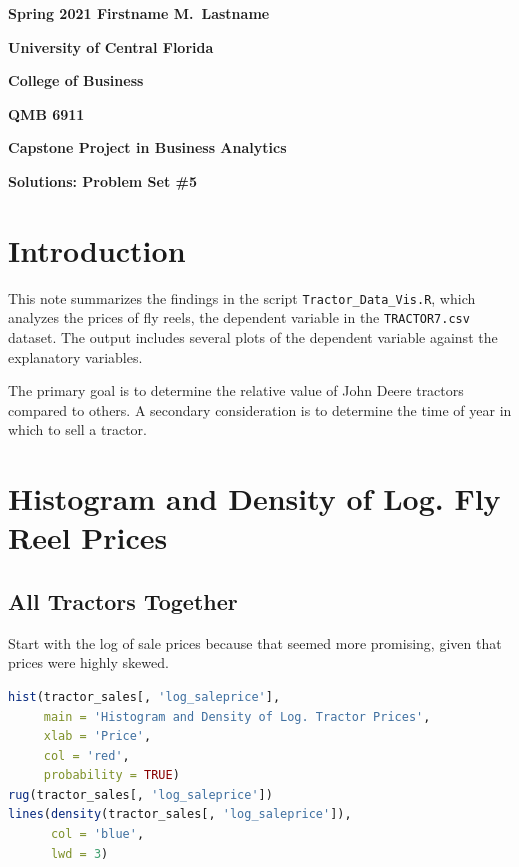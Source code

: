\documentclass[11pt]{book}
\begin{document}

\pagestyle{empty}
{\noindent\bf Spring 2021 \hfill Firstname M.~Lastname}
\vskip 16pt
\centerline{\bf University of Central Florida}
\centerline{\bf College of Business}
\vskip 16pt
\centerline{\bf QMB 6911}
\centerline{\bf Capstone Project in Business Analytics}
\vskip 10pt
\centerline{\bf Solutions:  Problem Set \#5}
\vskip 32pt
\noindent

\section{Introduction}

This note summarizes the findings in the script
\texttt{Tractor\_Data\_Vis.R},
which analyzes the prices of fly reels,
the dependent variable in the \texttt{TRACTOR7.csv} dataset.
The output includes several plots of the 
dependent variable against the explanatory variables.

The primary goal is to determine the relative value of John Deere tractors compared to others. 
A secondary consideration is to determine the time of year in which to 
sell a tractor. 

\vfill
\pagebreak
\section{Histogram and Density of Log. Fly Reel Prices}


\subsection{All Tractors Together}

Start with the log of sale prices because that
seemed more promising, given that prices were highly skewed.

\begin{lstlisting}[language=R]
hist(tractor_sales[, 'log_saleprice'],
     main = 'Histogram and Density of Log. Tractor Prices',
     xlab = 'Price',
     col = 'red',
     probability = TRUE)
rug(tractor_sales[, 'log_saleprice'])
lines(density(tractor_sales[, 'log_saleprice']),
      col = 'blue',
      lwd = 3)
\end{lstlisting}
\end{document}
